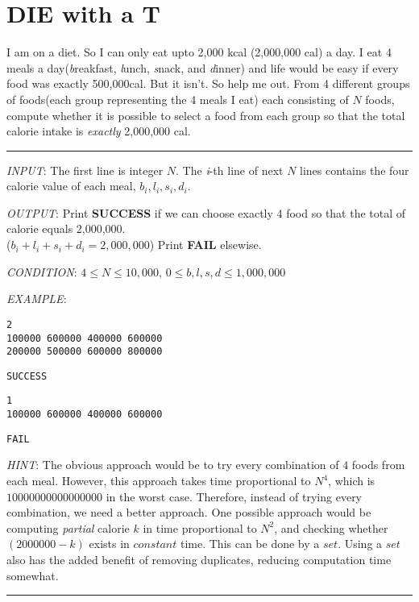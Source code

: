 \documentclass{article}
\begin{document}
\thispagestyle{fancy}
\setcounter{section}{-1}

\section{DIE with a T}
I am on a diet. So I can only eat upto 2,000 kcal (2,000,000 cal) a day.
I eat 4 meals a day(\textit{b}reakfast, \textit{l}unch, \textit{s}nack, and
\textit{d}inner) and life would be easy if
every food was exactly 500,000cal. But it isn't. So help me out.
From 4 different groups of foods(each group representing the 4 meals I eat) each consisting of $N$ foods, compute whether it is possible to select a food from each group
so that the total calorie intake is \textit{exactly} 2,000,000 cal.\\
\noindent\rule{\textwidth}{0.9pt}
\textit{INPUT}: The first line is integer $N$.
The \textit{i}-th line of next $N$ lines contains the four calorie value of each
meal, $b_{i}, l_{i}, s_{i}, d_{i}$.

\textit{OUTPUT}: Print \textbf{SUCCESS} if we can choose exactly 4 food so that
the total of calorie equals 2,000,000.\\($b_{i}+l_{i}+s_{i}+d_{i} = 2,000,000$)
Print \textbf{FAIL} elsewise.

\textit{CONDITION}: $ 4 \le N \le 10,000$, $ 0 \le b,l,s,d \le 1,000,000$

\textit{EXAMPLE}:
\begin{lstlisting}
2
100000 600000 400000 600000
200000 500000 600000 800000
\end{lstlisting}
\begin{lstlisting}
SUCCESS
\end{lstlisting}
\begin{lstlisting}
1
100000 600000 400000 600000
\end{lstlisting}
\begin{lstlisting}
FAIL
\end{lstlisting}

\textit{HINT}: The obvious approach would be to try every combination
of $4$ foods from each meal. However, this approach takes time proportional to $N^4$,
which is $10000000000000000$ in the worst case.
Therefore, instead of trying every combination, we need a better approach.
One possible approach would be computing \textit{partial} calorie $k$ in time
proportional to $N^2$, and checking whether $(2000000-k)$ exists in $constant$ time. This can be done by a $set$. Using a $set$ also has the added benefit of
removing duplicates, reducing computation time somewhat.\\
\noindent\rule{\textwidth}{0.9pt}
\end{document}
